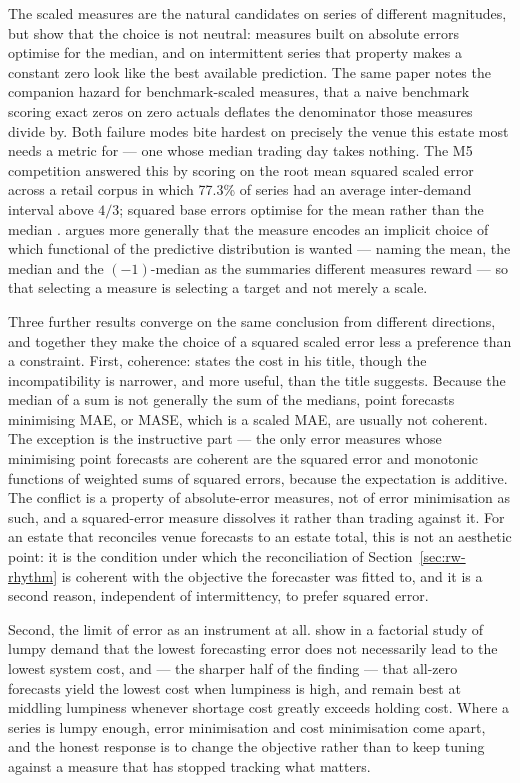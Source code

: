 The scaled measures are the natural candidates on series of different
magnitudes, but \citet{hewamalage_forecast_2023} show that the choice is not
neutral: measures built on absolute errors optimise for the median, and on
intermittent series that property makes a constant zero look like the best
available prediction. The same paper notes the companion hazard for
benchmark-scaled measures, that a naive benchmark scoring exact zeros on zero
actuals deflates the denominator those measures divide by. Both failure modes
bite hardest on precisely the venue this estate most needs a metric for --- one
whose median trading day takes nothing. The M5 competition
\citep{makridakis_m5_2022} answered this by scoring on the root mean squared
scaled error across a retail corpus in which 77.3\% of series had an average
inter-demand interval above $4/3$; squared base errors optimise for the mean
rather than the median \citep{hewamalage_forecast_2023}.
\citet{kolassa_why_2020} argues more generally that the measure encodes an
implicit choice of which functional of the predictive distribution is wanted
--- naming the mean, the median and the $(-1)$-median as the summaries
different measures reward --- so that selecting a measure is selecting a target
and not merely a scale.

Three further results converge on the same conclusion from different
directions, and together they make the choice of a squared scaled error less a
preference than a constraint. First, coherence:
\citet{kolassa_we_2023} states the cost in his title, though the
incompatibility is narrower, and more useful, than the title suggests. Because
the median of a sum is not generally the sum of the medians, point forecasts
minimising MAE, or MASE, which is a scaled MAE, are usually not coherent. The
exception is the instructive part --- the only error measures whose minimising
point forecasts are coherent are the squared error and monotonic functions of
weighted sums of squared errors, because the expectation is additive. The
conflict is a property of absolute-error measures, not of error minimisation as
such, and a squared-error measure dissolves it rather than trading against it.
For an estate that reconciles venue forecasts to an estate total, this is not
an aesthetic point: it is the condition under which the reconciliation of
Section~\ref{sec:rw-rhythm} is coherent with the objective the forecaster was
fitted to, and it is a second reason, independent of intermittency, to prefer
squared error.

Second, the limit of error as an instrument at all.
\citet{chatfield_all-zero_2007} show in a factorial study of lumpy demand that
the lowest forecasting error does not necessarily lead to the lowest system
cost, and --- the sharper half of the finding --- that all-zero forecasts yield
the lowest cost when lumpiness is high, and remain best at middling lumpiness
whenever shortage cost greatly exceeds holding cost. Where a series is lumpy
enough, error minimisation and cost minimisation come apart, and the honest
response is to change the objective rather than to keep tuning against a
measure that has stopped tracking what matters.

